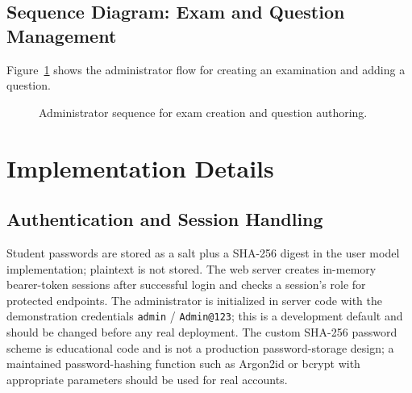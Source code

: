 \documentclass[12pt,a4paper,oneside]{book}
\newcommand{\msg}[4]{\draw[edge] (#2,#1) -- node[above,lbl,text width=37mm]{#4} (#3,#1);}
\newcommand{\ret}[4]{\draw[edge,dashed] (#2,#1) -- node[above,lbl,text width=37mm]{#4} (#3,#1);}
\newcommand{\selfmsg}[3]{\draw[edge] (#2,#1) -- ++(0.6,0) -- ++(0,-0.5) -- ++(-0.6,0);\node[lbl,anchor=west,align=left] at (#2+0.7,#1-0.25) {#3};}
\begin{document}
\subsection{Sequence Diagram: Exam and Question Management}
Figure~\ref{fig:adminseq} shows the administrator flow for creating an examination and adding a question.

\begin{figure}[H]
\centering
{} 
\caption{Administrator sequence for exam creation and question authoring.}
\label{fig:adminseq}
\end{figure}

\section{Implementation Details}
\subsection{Authentication and Session Handling}
Student passwords are stored as a salt plus a SHA-256 digest in the user model implementation; plaintext is not stored. The web server creates in-memory bearer-token sessions after successful login and checks a session's role for protected endpoints. The administrator is initialized in server code with the demonstration credentials \texttt{admin} / \texttt{Admin@123}; this is a development default and should be changed before any real deployment. The custom SHA-256 password scheme is educational code and is not a production password-storage design; a maintained password-hashing function such as Argon2id or bcrypt with appropriate parameters should be used for real accounts.
\end{document}
